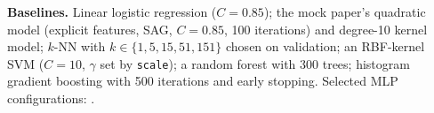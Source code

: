 \documentclass{article}
\theoremstyle{plain}
\begin{document}
\textbf{Baselines.} Linear logistic regression ($C=0.85$); the mock paper's quadratic model (explicit features, SAG, $C=0.85$, 100 iterations) and degree-10 kernel model; $k$-NN with $k\in\{1,5,15,51,151\}$ chosen on validation; an RBF-kernel SVM ($C=10$, $\gamma$ set by \texttt{scale}); a random forest with 300 trees; histogram gradient boosting with 500 iterations and early stopping. Selected MLP configurations: \MLPconfigs.

\begin{table}[h]
\caption{All KryptoNet-40 adaptation methods on Kryptonite-40-Adapt: trainable parameters and test accuracy (\%), mean $\pm$ 95\% CI over 5 splits of 800 test points.}
\label{tab:adapt}
\vskip 0.05in
\begin{center}
\setlength{\tabcolsep}{4pt}

\end{center}
\end{table}

\begin{table}[h]
\caption{Wall-clock time on two CPU cores, energy and emissions of our experiments (assumptions in Section~\ref{sec:discussion}).}
\label{tab:energy}
\vskip 0.05in
\begin{center}
\setlength{\tabcolsep}{3pt}

\end{center}
\end{table}
\end{document}
